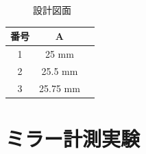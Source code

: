 \documentclass[dvipdfmx,autodetect-engine]{jreport}
\begin{document}
\begin{figure}[h!]
\centering

\caption[]{設計図面}
\label{fig:lens_pinhole_ring_aperture}
\end{figure}

\begin{center}
  \begin{tabular}{|c|c|l|} \hline
    番号 & A \\ \hline
    1 & 25 mm  \\
    2 & 25.5 mm  \\
    3 & 25.75 mm \\ \hline
 \hline
  \end{tabular}
  \label{tb:lens_ring_aperture_inner_diameter}
  \caption{輪帯アパーチャ内円の直径}
\end{center}

\newpage
\chapter{ミラー計測実験}
\minitoc
\end{document}
